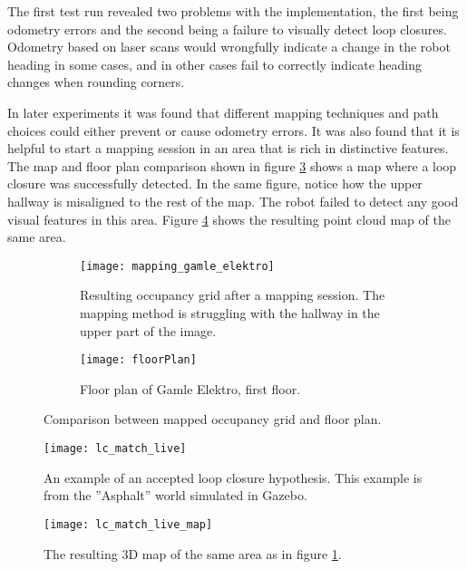The first test run revealed two problems with the implementation, the first being odometry errors and the second being a failure to visually detect loop closures. Odometry based on laser scans would wrongfully indicate a change in the robot heading in some cases, and in other cases fail to correctly indicate heading changes when rounding corners. 

In later experiments it was found that different mapping techniques and path choices could either prevent or cause odometry errors. It was also found that it is helpful to start a mapping session in an area that is rich in distinctive features. The map and floor plan comparison shown in figure \ref{fig:comparison} shows a map where a loop closure was successfully detected. In the same figure, notice how the upper hallway is misaligned to the rest of the map. The robot failed to detect any good visual features in this area. Figure \ref{fig:lc_match_live} shows the resulting point cloud map of the same area.

\begin{figure}
	\centering
	\begin{subfigure}[b]{1\textwidth}
		\texttt{[image: mapping\_gamle\_elektro]}
		\caption{Resulting occupancy grid after a mapping session. The mapping  method is struggling with the  hallway in the upper part of the image.}
		\label{fig:mapping_gamle_elektro}
	\end{subfigure}
	\begin{subfigure}[b]{1\textwidth}
		\texttt{[image: floorPlan]}
		\caption{Floor plan of Gamle Elektro, first floor.}
		\label{fig:floorPlan}
	\end{subfigure}
	\caption{Comparison between mapped occupancy grid and floor plan.}\label{fig:comparison}
\end{figure}



\begin{figure}[h]
	\centering
	\texttt{[image: lc\_match\_live]}
	\caption{An example of an accepted loop closure hypothesis. This example is from the ''Asphalt'' world simulated in Gazebo.}
	\label{fig:lc_match_live}
\end{figure}

\begin{figure}[p]
	\centering
	\texttt{[image: lc\_match\_live\_map]}
	\caption{The resulting 3D map of the same area as in figure \ref{fig:mapping_gamle_elektro}.}
	\label{fig:lc_match_live_map}
\end{figure}

